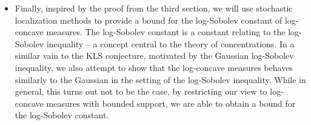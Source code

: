 \begin{itemize}
  \item Finally, inspired by the proof from the third section, we will use stochastic localization methods to 
    provide a bound for the log-Sobolev constant of log-concave measures. The log-Sobolev constant is 
    a constant relating to the log-Sobolev inequality -- a concept central to the theory of concentrations. 
    In a similar vain to the KLS conjecture, motivated by the Gaussian log-Sobolev inequality, we also
    attempt to show that the log-concave measures behaves similarly to the Gaussian in the setting of 
    the log-Sobolev inequality. While in general, this turns out not to be the case, by restricting 
    our view to log-concave measures with bounded support, we are able to obtain a bound for the 
    log-Sobolev constant. 
    
\end{itemize}

